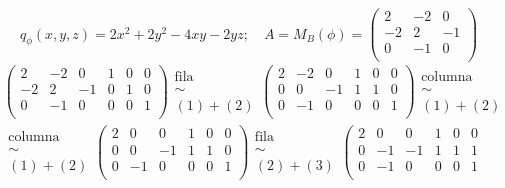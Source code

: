 \begin{example}
    \[
        q_\phi(x,y,z)=2x^2+2y^2-4xy-2yz; \quad A = M_B(\phi) =
        \begin{pmatrix}
            2 & -2 & 0 \\
            -2 & 2 & -1 \\
            0 & -1 & 0 \\
        \end{pmatrix}
    \]
    \begin{gather*}
        \left(
        \begin{array}{ccc|ccc}
            2 & -2 & 0 & 1 & 0 & 0 \\
            -2 & 2 & -1 & 0 & 1 & 0 \\
            0 & -1 & 0 & 0 & 0 & 1 \\
        \end{array}
        \right)
        \substack{\text{fila} \\ \sim \\ (1) + (2)}
        \left(
        \begin{array}{ccc|ccc}
            2 & -2 & 0 & 1 & 0 & 0 \\
            0 & 0 & -1 & 1 & 1 & 0 \\
            0 & -1 & 0 & 0 & 0 & 1 \\
        \end{array}
        \right)
        \substack{\text{columna} \\ \sim \\ (1) + (2)}
        \\
        \substack{\text{columna} \\ \sim \\ (1) + (2)}
        \left(
        \begin{array}{ccc|ccc}
            2 & 0 & 0 & 1 & 0 & 0 \\
            0 & 0 & -1 & 1 & 1 & 0 \\
            0 & -1 & 0 & 0 & 0 & 1 \\
        \end{array}
        \right)
        \substack{\text{fila} \\ \sim \\ (2) + (3)}
        \left(
        \begin{array}{ccc|ccc}
            2 & 0 & 0 & 1 & 0 & 0 \\
            0 & -1 & -1 & 1 & 1 & 1 \\
            0 & -1 & 0 & 0 & 0 & 1 \\

\end{array}
\end{gather*}
\end{example}
